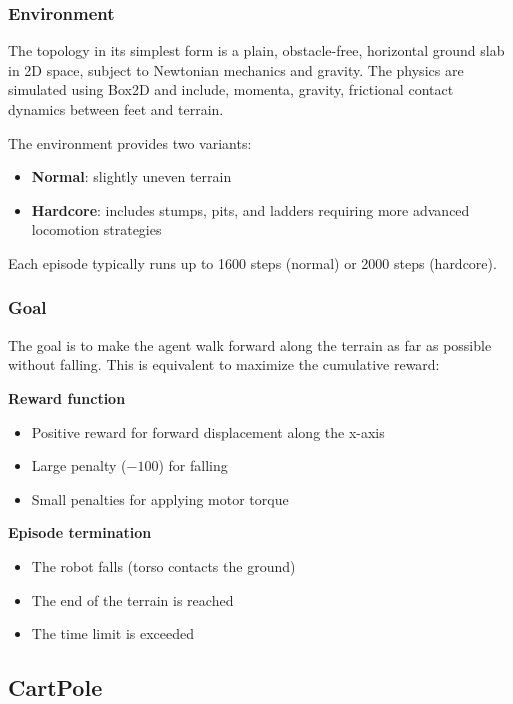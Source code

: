 \subsubsection{Environment}
The topology in its simplest form is a plain, obstacle-free, horizontal ground slab in 2D space, subject to Newtonian mechanics and gravity. The physics are simulated using Box2D and include, momenta, gravity, frictional contact dynamics between feet and terrain.

The environment provides two variants:
\begin{itemize}
    \item \textbf{Normal}: slightly uneven terrain
    \item \textbf{Hardcore}: includes stumps, pits, and ladders requiring more advanced locomotion strategies
\end{itemize}

Each episode typically runs up to 1600 steps (normal) or 2000 steps (hardcore).

\subsubsection{Goal}
The goal is to make the agent walk forward along the terrain as far as possible without falling.
This is equivalent to maximize the cumulative reward:

\noindent
\begin{minipage}[t]{0.48\textwidth}
\textbf{Reward function}
\begin{itemize}
    \item Positive reward for forward displacement along the x-axis
    \item Large penalty ($-100$) for falling
    \item Small penalties for applying motor torque
\end{itemize}
\end{minipage}
\hfill
\begin{minipage}[t]{0.48\textwidth}
\textbf{Episode termination}
\begin{itemize}
    \item The robot falls (torso contacts the ground)
    \item The end of the terrain is reached
    \item The time limit is exceeded
\end{itemize}
\end{minipage}

\subsection{CartPole}

